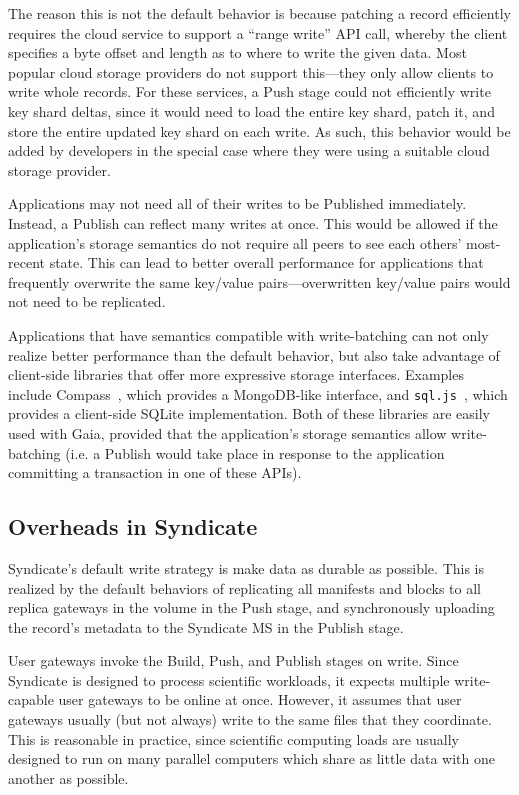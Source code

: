 The reason this is not the default behavior is because patching a record
efficiently requires the cloud service to support a ``range write''
API call, whereby the client specifies a byte offset and length as to where to
write the given data.  Most popular cloud storage providers do not support
this---they only allow clients to write whole records.  For these services,
a Push stage could not efficiently write key shard deltas, since it would need
to load the entire key shard, patch it, and store the entire updated key shard
on each write.  As such, this behavior would be added by developers in the
special case where they were using a suitable cloud storage provider.


Applications may not need all of their writes to be Published immediately.
Instead, a Publish can reflect many writes at once.  This would be allowed if
the application's storage semantics do not require all peers to see each others'
most-recent state.  This can lead to better overall performance for applications
that frequently overwrite the same key/value pairs---overwritten key/value pairs
would not need to be replicated.

Applications that have semantics compatible with write-batching can not only
realize better performance than the default behavior, but also take advantage of
client-side libraries that offer more expressive storage interfaces.
Examples include Compass~\cite{blockstack-compass}, which provides a
MongoDB-like interface, and \texttt{sql.js}~\cite{sql.js}, which provides a
client-side SQLite implementation.  Both of these libraries are easily used with
Gaia, provided that the application's storage semantics allow write-batching
(i.e. a Publish would take place in response to the application committing a
transaction in one of these APIs).

\subsection{Overheads in Syndicate}

Syndicate's default write strategy is make data as durable as possible. 
This is realized by the default behaviors of replicating all
manifests and blocks to all replica gateways in the volume in the
Push stage, and synchronously uploading the record's metadata to the Syndicate
MS in the Publish stage.

User gateways invoke the Build, Push, and Publish stages on write.
Since Syndicate is designed to process scientific workloads, it expects
multiple write-capable user gateways to be online at once.  However, it assumes
that user gateways usually (but not always) write to the same files that they
coordinate.  This is reasonable in practice, since scientific computing loads
are usually designed to run on many parallel computers which share as little
data with one another as possible.

